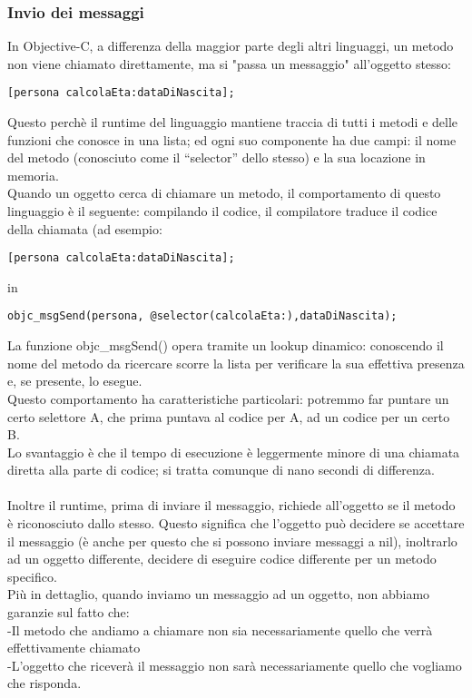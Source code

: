 \subsubsection{Invio dei messaggi}
In Objective-C, a differenza della maggior parte degli altri linguaggi, un metodo non viene chiamato direttamente, ma si "passa un messaggio" all'oggetto stesso: 
\lstset{language=[Objective]C, breakindent=40pt, breaklines}
\begin{lstlisting}
[persona calcolaEta:dataDiNascita];
\end{lstlisting}
Questo perchè il runtime del linguaggio mantiene traccia di tutti i metodi e delle funzioni che conosce in una lista; ed ogni suo componente ha due campi: il nome del metodo (conosciuto come il “selector” dello stesso) e la sua locazione in memoria.\\Quando un oggetto cerca di chiamare un metodo, il comportamento di questo linguaggio è il seguente: compilando il codice, il compilatore traduce il codice della chiamata (ad esempio: 
\lstset{language=[Objective]C, breakindent=40pt, breaklines}
\begin{lstlisting}
[persona calcolaEta:dataDiNascita];
\end{lstlisting}
in \lstset{language=[Objective]C, breakindent=40pt, breaklines}
\begin{lstlisting}
objc_msgSend(persona, @selector(calcolaEta:),dataDiNascita);
\end{lstlisting}
\bigskip
\bigskip
La funzione objc\_msgSend() opera tramite un lookup dinamico: conoscendo il nome del metodo da ricercare scorre la lista per verificare la sua effettiva presenza e, se presente, lo esegue.\\ 
Questo comportamento ha caratteristiche particolari: potremmo far puntare un certo selettore A, che prima puntava al codice per A, ad un codice per un certo B.\\ 
Lo svantaggio è che il tempo di esecuzione è leggermente minore di una chiamata diretta alla parte di codice; si tratta comunque di nano secondi di differenza.\\
\\Inoltre il runtime, prima di inviare il messaggio, richiede all’oggetto se il metodo è riconosciuto dallo stesso. Questo significa che l’oggetto può decidere se accettare il messaggio (è anche per questo che si possono inviare messaggi a nil), inoltrarlo ad un oggetto differente, decidere di eseguire codice differente per un metodo specifico.\\Più in dettaglio, quando inviamo un messaggio ad un oggetto, non abbiamo garanzie sul fatto che: \\-Il metodo che andiamo a chiamare non sia necessariamente quello che verrà effettivamente chiamato\\-L’oggetto che riceverà il messaggio non sarà necessariamente quello che vogliamo che risponda.
